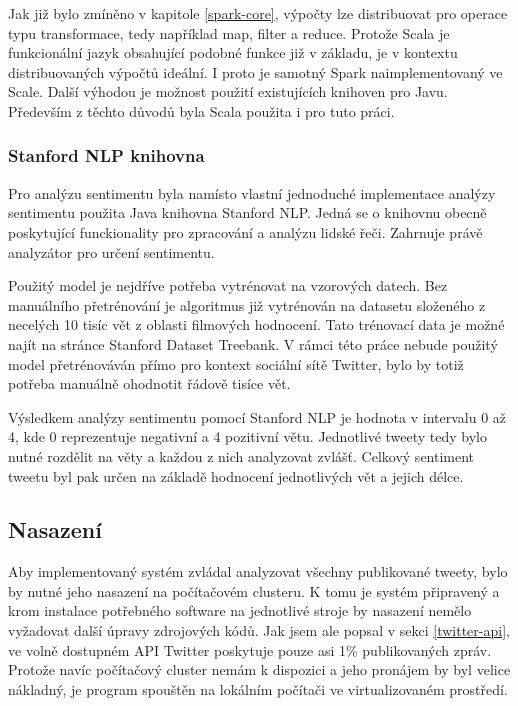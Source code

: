 \documentclass[thesis=B,czech]{FITthesis}[2012/06/26]
\begin{document}
Jak již bylo zmíněno v kapitole \ref{spark-core}, výpočty lze distribuovat pro operace typu transformace, tedy například map, filter a reduce. Protože Scala je funkcionální jazyk obsahující podobné funkce již v základu, je v kontextu distribuovaných výpočtů ideální. I proto je samotný Spark naimplementovaný ve Scale\cite{kkkkjjjhh}. Další výhodou je možnost použití existujících knihoven pro Javu. Především z těchto důvodů byla Scala použita i pro tuto práci. 

\subsubsection{Stanford NLP knihovna}
\label{stanford-nlp}
	Pro analýzu sentimentu byla namísto vlastní jednoduché implementace analýzy sentimentu použita Java knihovna Stanford NLP\cite{fghjkkl}. Jedná se o knihovnu obecně poskytující funckionality pro zpracování a analýzu lidské řeči. Zahrnuje právě analyzátor pro určení sentimentu. 
	
	Použitý model je nejdříve potřeba vytrénovat na vzorových datech. Bez manuálního přetrénování je algoritmus již vytrénován na datasetu složeného z necelých 10 tisíc vět z oblasti filmových hodnocení. Tato trénovací data je možné najít na stránce Stanford Dataset Treebank\cite{ssdassa}. V rámci této práce nebude použitý model přetrénováván přímo pro kontext sociální sítě Twitter, bylo by totiž potřeba manuálně ohodnotit řádově tisíce vět. 
	
	Výsledkem analýzy sentimentu pomocí Stanford NLP je hodnota v intervalu 0 až 4, kde 0 reprezentuje negativní a 4 pozitivní větu. Jednotlivé tweety tedy bylo nutné rozdělit na věty a každou z nich analyzovat zvlášť. Celkový sentiment tweetu byl pak určen na základě hodnocení jednotlivých vět a jejich délce. 

\subsection{Nasazení}
Aby implementovaný systém zvládal analyzovat všechny publikované tweety, bylo by nutné jeho nasazení na počítačovém clusteru. K tomu je systém připravený a krom instalace potřebného software na jednotlivé stroje by nasazení nemělo vyžadovat další úpravy zdrojových kódů. Jak jsem ale popsal v sekci \ref{twitter-api}, ve volně dostupném API Twitter poskytuje pouze asi 1\% publikovaných zpráv. Protože navíc počítačový cluster nemám k dispozici a jeho pronájem by byl velice nákladný, je program spouštěn na lokálním počítači ve virtualizovaném prostředí. 
\end{document}
